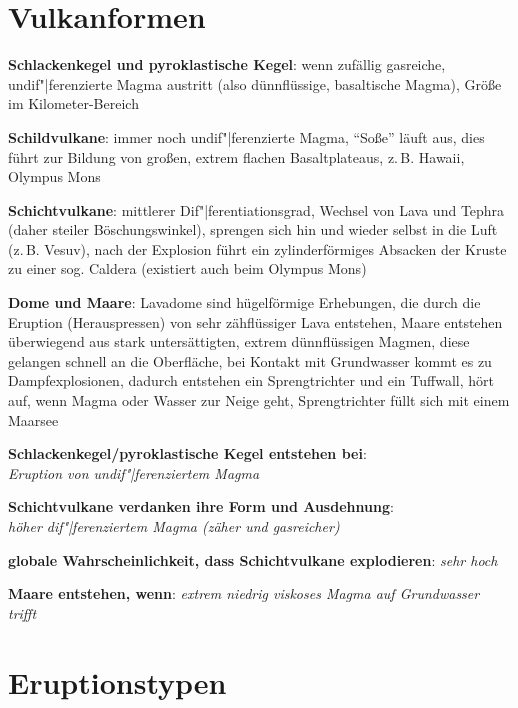 \section{%
    Vulkanformen%
}

\textbf{Schlackenkegel und pyroklastische Kegel}:
wenn zufällig gasreiche, undif"|ferenzierte Magma austritt
(also dünnflüssige, basaltische Magma),
Größe im Kilometer-Bereich

\textbf{Schildvulkane}:
immer noch undif"|ferenzierte Magma,
"`Soße"' läuft aus,
dies führt zur Bildung von großen, extrem flachen Basaltplateaus,
z.\,B. Hawaii, Olympus Mons

\textbf{Schichtvulkane}:
mittlerer Dif"|ferentiationsgrad,
Wechsel von Lava und Tephra (daher steiler Böschungswinkel),
sprengen sich hin und wieder selbst in die Luft (z.\,B. Vesuv),
nach der Explosion führt ein zylinderförmiges Absacken der Kruste zu einer sog. Caldera
(existiert auch beim Olympus Mons)

\textbf{Dome und Maare}:
Lavadome sind hügelförmige Erhebungen, die durch die Eruption (Herauspressen) von
sehr zähflüssiger Lava entstehen,
Maare entstehen überwiegend aus stark untersättigten, extrem dünnflüssigen Magmen,
diese gelangen schnell an die Oberfläche,
bei Kontakt mit Grundwasser kommt es zu Dampfexplosionen,
dadurch entstehen ein Sprengtrichter und ein Tuffwall,
hört auf, wenn Magma oder Wasser zur Neige geht,
Sprengtrichter füllt sich mit einem Maarsee

\begin{wichtig}
    \item
    \textbf{Schlackenkegel/pyroklastische Kegel entstehen bei}:\\
    \emph{Eruption von undif"|ferenziertem Magma}

    \item
    \textbf{Schichtvulkane verdanken ihre Form und Ausdehnung}:\\
    \emph{höher dif"|ferenziertem Magma (zäher und gasreicher)}

    \item
    \textbf{globale Wahrscheinlichkeit, dass Schichtvulkane explodieren}:
    \emph{sehr hoch}

    \item
    \textbf{Maare entstehen, wenn}:
    \emph{extrem niedrig viskoses Magma auf Grundwasser trifft}
\end{wichtig}

\pagebreak

\section{%
    Eruptionstypen%
}

